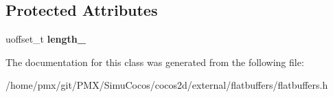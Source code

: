 \subsection*{Protected Attributes}
\begin{DoxyCompactItemize}
\item 
\mbox{\label{classflatbuffers_1_1Vector_a3c5b8722d3a654191f58fb71f98abf4d}} 
uoffset\+\_\+t {\bfseries length\+\_\+}
\end{DoxyCompactItemize}


The documentation for this class was generated from the following file\+:\begin{DoxyCompactItemize}
\item 
/home/pmx/git/\+P\+M\+X/\+Simu\+Cocos/cocos2d/external/flatbuffers/flatbuffers.\+h\end{DoxyCompactItemize}

